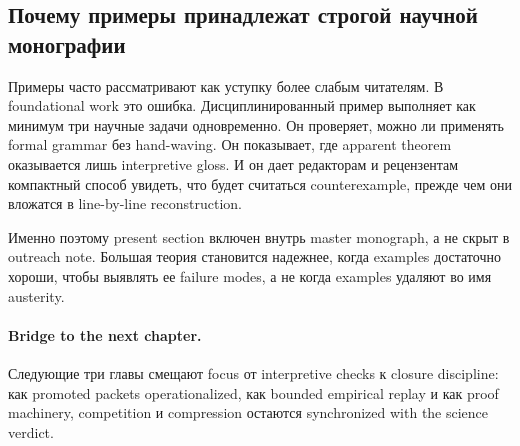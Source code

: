 \subsection{Почему примеры принадлежат строгой научной монографии}

Примеры часто рассматривают как уступку более слабым читателям. В
foundational work это ошибка. Дисциплинированный пример выполняет как
минимум три научные задачи одновременно. Он проверяет, можно ли применять
formal grammar без hand-waving. Он показывает, где apparent theorem
оказывается лишь interpretive gloss. И он дает редакторам и рецензентам
компактный способ увидеть, что будет считаться counterexample, прежде чем
они вложатся в line-by-line reconstruction.

Именно поэтому present section включен внутрь master monograph, а не скрыт в
outreach note. Большая теория становится надежнее, когда examples достаточно
хороши, чтобы выявлять ее failure modes, а не когда examples удаляют во имя
austerity.

\paragraph{Bridge to the next chapter.}
Следующие три главы смещают focus от interpretive checks к closure discipline:
как promoted packets operationalized, как bounded empirical replay и как proof
machinery, competition и compression остаются synchronized with the science
verdict.

\clearpage
